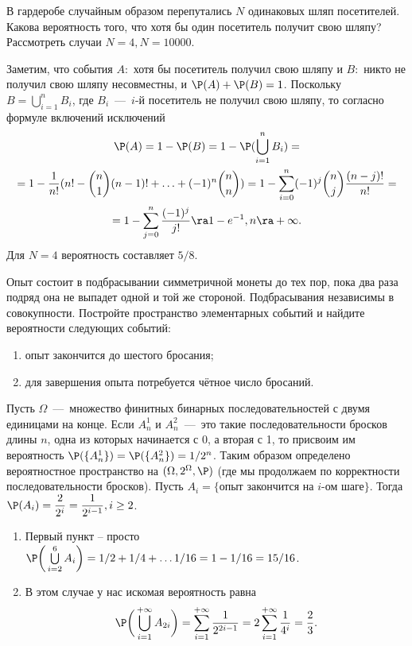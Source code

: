 \begin{problem}[17]
    В гардеробе случайным образом перепутались $N$ одинаковых шляп посетителей.
    Какова вероятность того, что хотя бы один посетитель получит свою шляпу?
    Рассмотреть случаи $N = 4, N = 10000$.
\end{problem}
\begin{solution}
    Заметим, что события $A:$ хотя бы посетитель получил свою шляпу и $B:$ никто не получил свою шляпу несовместны, и $\P(A) + \P(B) = 1$.
    Поскольку $B = \bigcup\limits_{i = 1}^n B_i$, где $B_i$~---~$i$-й посетитель не получил свою шляпу, то согласно формуле включений исключений
    \begin{multline*}
        \P(A) = 1 - \P(B) = 1 - \P(\bigcup\limits_{i = 1}^n B_i) = \\ = 1 - \dfrac{1}{n!}(n! - \binom{n}{1}(n - 1)! + \ldots + (-1)^n\binom{n}{n}) = 1 - \sum\limits_{i = 0}^n(-1)^j\binom{n}{j}\dfrac{(n - j)!}{n!} = \\ = 1 - \sum\limits_{j = 0}^n \dfrac{(-1)^j}{j!} \ra 1 - e^{-1}, n \ra +\infty.
    \end{multline*}
    Для $N = 4$ вероятность составляет $5/8$.
\end{solution}
\begin{problem}[30]
    Опыт состоит в подбрасывании симметричной монеты до тех пор, пока два раза подряд она не выпадет одной и той же стороной.
    Подбрасывания независимы в совокупности.
    Постройте пространство элементарных событий и найдите вероятности следующих событий:
    \begin{enumerate}
        \item опыт закончится до шестого бросания;
        \item для завершения опыта потребуется чётное число бросаний.
    \end{enumerate}
\end{problem}
\begin{solution}
    Пусть $\Omega$~---~множество финитных бинарных последовательностей с двумя единицами на конце.
    Если $A^1_n$ и $A^2_n$~---~это такие последовательности бросков длины $n$, одна из которых начинается с 0, а вторая с 1, то присвоим им вероятность $\P(\{A^1_n\}) = \P(\{A^2_n\}) = 1/2^n$.
    Таким образом определено вероятностное пространство на $(\Omega, 2^{\Omega}, \P)$ (где мы продолжаем по корректности последовательности бросков).
    Пусть $A_i = \{\text{опыт закончится на }i\text{-ом шаге}\}$.
    Тогда $\P(A_i) = \dfrac{2}{2^i} = \dfrac{1}{2^{i - 1}}, i \geq 2$.
    \begin{enumerate}
        \item Первый пункт -- просто $\P\biggr(\bigcup\limits_{i = 2}^{6} A_i\biggr) = 1/2 + 1/4 + \ldots 1/16 = 1 - 1/16 = 15/16$.
        \item В этом случае у нас искомая вероятность равна
        \[
            \P\biggr(\bigcup_{i = 1}^{+\infty}A_{2i}\biggr) = \sum\limits_{i = 1}^{+\infty} \dfrac{1}{2^{2i - 1}} = 2\sum\limits_{i = 1}^{+\infty}\dfrac{1}{4^i} = \dfrac{2}{3}.
        \]
    \end{enumerate}
\end{solution}
